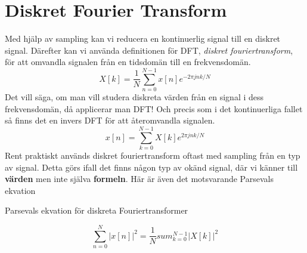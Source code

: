 \documentclass{article}
\begin{document}
\section{Diskret Fourier Transform}
Med hjälp av sampling kan vi reducera en kontinuerlig signal till en diskret signal. Därefter kan vi använda definitionen för DFT, \emph{diskret fouriertransform}, för att omvandla signalen från en tidsdomän till en frekvensdomän.
$$X[k] = \frac{1}{N} \sum_{n=0}^{N-1} x[n] e^{-2 \pi j n k/N}$$
Det vill säga, om man vill studera diskreta värden från en signal i dess frekvensdomän, då applicerar man DFT! Och precis som i det kontinuerliga fallet så finns det en invers DFT för att återomvandla signalen.
$$x[n] = \sum_{k=0}^{N-1} X[k] e^{2 \pi j n k/N} $$ %
Rent praktiskt används diskret fouriertransform oftast med sampling från en typ av signal. Detta görs ifall det finns någon typ av okänd signal, där vi känner till \textbf{värden} men inte själva \textbf{formeln}. %
Här är även det motsvarande Parsevals ekvation

Parsevals ekvation för diskreta Fouriertransformer

$$\sum_{n=0}^{N} |x[n]|^2 = \frac{1}{N} sum_{k=0}^{N-1} |X[k]|^2 $$
\end{document}
